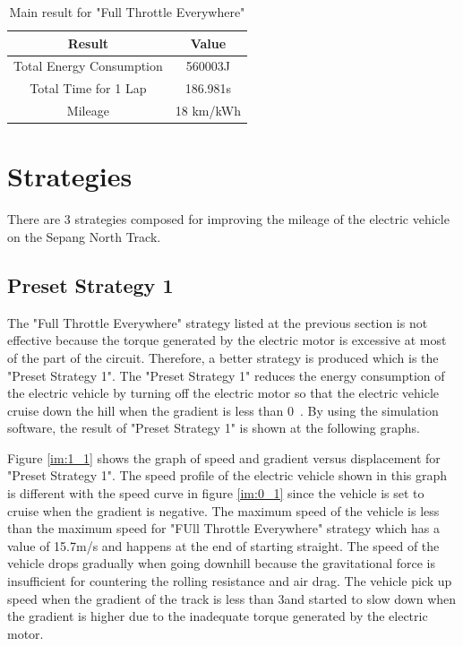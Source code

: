 \begin{table}[htbp]
\begin{center}
\begin{tabular}{|c|c|}
\hline
\textbf{Result} & \textbf{Value} \\ \hline
Total Energy Consumption & 560003J \\ \hline
Total Time for 1 Lap & 186.981s \\ \hline
Mileage & 18 km/kWh \\ \hline
\end{tabular}
\end{center}
\caption{Main result for "Full Throttle Everywhere" }
\label{tb:fullThrottleResult}
\end{table} \clearpage

\section{Strategies}
There are 3 strategies composed for improving the mileage of the electric vehicle on the Sepang North Track.

\subsection{Preset Strategy 1}

The "Full Throttle Everywhere" strategy listed at the previous section is not effective because the torque generated by the electric motor is excessive at most of the part of the circuit. Therefore, a better strategy is produced which is the "Preset Strategy 1". The "Preset Strategy 1" reduces the energy consumption of the electric vehicle by turning off the electric motor so that the electric vehicle cruise down the hill when the gradient is less than 0\textdegree \ . By using the simulation software, the result of "Preset Strategy 1" is shown at the following graphs.

Figure \ref{im:1_1} shows the graph of speed and gradient versus displacement for "Preset Strategy 1". The speed profile of the electric vehicle shown in this graph is different with the speed curve in figure \ref{im:0_1} since the vehicle is set to cruise when the gradient is negative. The maximum speed of the vehicle is less than the maximum speed for "FUll Throttle Everywhere" strategy which has a value of 15.7m/s and happens at the end of starting straight. The speed of the vehicle drops gradually when going downhill because the gravitational force is insufficient for countering the rolling resistance and air drag. The vehicle pick up speed when the gradient of the track is less than 3\textdegree and started to slow down when the gradient is higher due to the inadequate torque generated by the electric motor.

